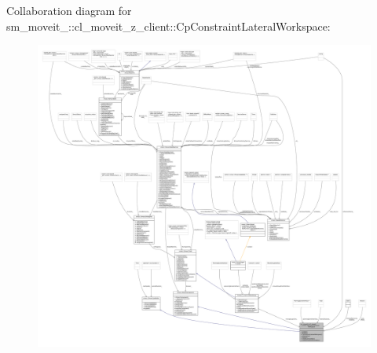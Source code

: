 Collaboration diagram for sm\+\_\+moveit\+\_\+:\+:cl\+\_\+moveit\+\_\+z\+\_\+client\+:\+:Cp\+Constraint\+Lateral\+Workspace\+:
\nopagebreak
\begin{figure}[H]
\begin{center}
\leavevmode
\includegraphics[width=350pt]{classsm__moveit__4_1_1cl__moveit__z__client_1_1CpConstraintLateralWorkspace__coll__graph}
\end{center}
\end{figure}
